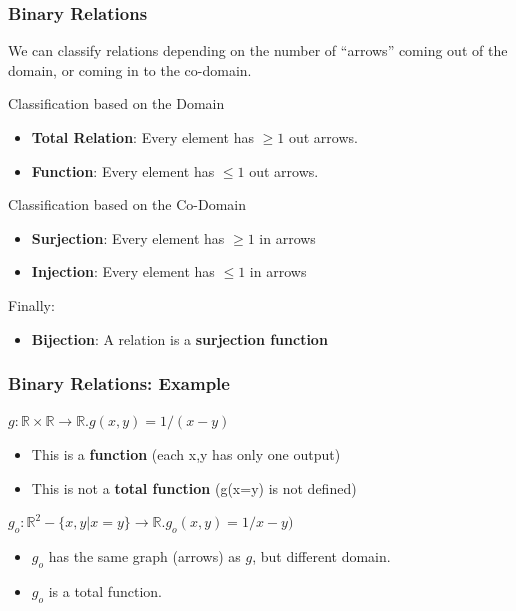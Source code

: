 \documentclass{beamer}
\begin{document}
\begin{frame}
  \frametitle{Binary Relations}

  {\larger We can classify relations depending on the number of
    ``arrows'' coming out of the domain, or coming in to the
    co-domain.

    \bigskip

    Classification based on the Domain
    \begin{itemize}
    \item {\bf Total Relation}: Every element has $\geq 1$ out arrows.
    \item {\bf Function}: Every element has $\leq 1$ out arrows.
    \end{itemize}

    Classification based on the Co-Domain
    \begin{itemize}
    \item {\bf Surjection}: Every element has $\geq 1$ in arrows
    \item {\bf Injection}: Every element has $\leq 1$ in arrows
    \end{itemize}

    \bigskip
    Finally:
    \begin{itemize}
    \item {\bf Bijection}: A relation is a {\bf surjection function}
    \end{itemize}    
  }
\end{frame}

\begin{frame}
  \frametitle{Binary Relations: Example}

  {\larger
    \begin{block}{$g: \mathbb{R}\times\mathbb{R} \rightarrow \mathbb{R}. g(x,y) = 1/(x-y)$}
      \begin{itemize}
      \item This is a {\bf function} (each x,y has only one output)
      \item This is not a {\bf total function} (g(x=y) is not defined)
      \end{itemize}      
    \end{block}

    \begin{block}{$g_o: \mathbb{R}^2 - \{x,y|x=y\} \rightarrow \mathbb{R}. g_o(x,y) = 1/x-y)$}
      \begin{itemize}
      \item $g_o$ has the same graph (arrows) as $g$, but different domain.
      \item $g_o$ is a total function.
      \end{itemize}
  
    \end{block}
  }
\end{frame}
\end{document}
